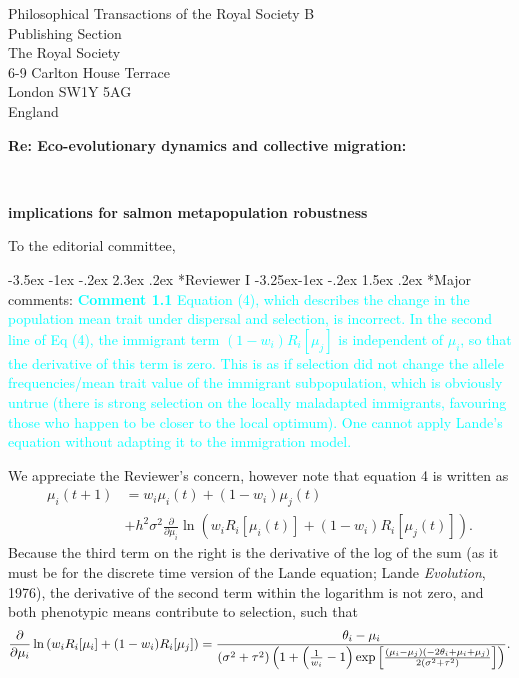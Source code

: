 \documentclass[ucm,12pt]{ucletter}
\makeatletter
\newcounter{section}
\newcounter{subsection}[section]
\renewcommand\section{\@startsection {section}{1}{\z@}%
                                   {-3.5ex \@plus -1ex \@minus -.2ex}%
                                   {2.3ex \@plus.2ex}%
                                   {\normalfont\Large\bfseries}}
\newcommand\subsection{\@startsection{subsection}{2}{\z@}%
                                     {-3.25ex\@plus -1ex \@minus -.2ex}%
                                     {1.5ex \@plus .2ex}%
                                     {\normalfont\large\bfseries}}
\makeatother
\begin{document}
\begin{letter}{
    Philosophical Transactions of the Royal Society B\\
    Publishing Section\\
    The Royal Society\\
    6-9 Carlton House Terrace\\
    London SW1Y 5AG\\
    England\\
    \centerline{\bf{Re: Eco-evolutionary dynamics and collective migration:}}\\
     \centerline{\bf{implications for salmon metapopulation robustness}}
}


\opening{To the editorial committee,}


\section*{Reviewer I}
\subsection*{Major comments:}
\noindent \textcolor{cyan}{
{\bf Comment 1.1} Equation (4), which describes the change in the population mean trait under dispersal and selection, is incorrect. In the second line of Eq (4), the immigrant term $(1-w_i) R_i [\mu_j]$ is independent of $\mu_i$, so that the derivative of this term is zero. This is as if selection did not change the allele frequencies/mean trait value of the immigrant subpopulation, which is obviously untrue (there is strong selection on the locally maladapted immigrants, favouring those who happen to be closer to the local optimum). One cannot apply Lande's equation without adapting it to the immigration model.
}

 We appreciate the Reviewer's concern, however note that equation 4 is written as
\begin{align}
  \label{eq:mu}
  \mu_i(t+1) &= w_i\mu_i(t) + (1-w_i)\mu_j(t) \\ \nonumber
  &+ h^2\sigma^2\frac{\partial}{\partial \mu_i}\ln\left(w_i R_i[\mu_i(t)] + (1-w_i)R_i[\mu_j(t)]  \right).
\end{align}
Because the third term on the right is the derivative of the log of the sum (as it must be for the discrete time version of the Lande equation; Lande \emph{Evolution}, 1976), the derivative of the second term within the logarithm is not zero, and both phenotypic means contribute to selection, such that
\begin{equation}
  \frac{\partial}{\partial \mu_i}\ln\left(w_i R_i[\mu_i] + (1-w_i)R_i[\mu_j]  \right) = \frac{\theta_i-\mu_i}{\left(\sigma ^2+\tau ^2\right) \left(1+\left(\frac{1}{w_i}-1\right) {\rm exp}\left[\frac{(\mu_i-\mu_j) (-2 \theta_i+\mu_i+\mu_j)}{2 \left(\sigma ^2+\tau ^2\right)}\right]\right)}.
\end{equation}


\end{letter}
\end{document}
